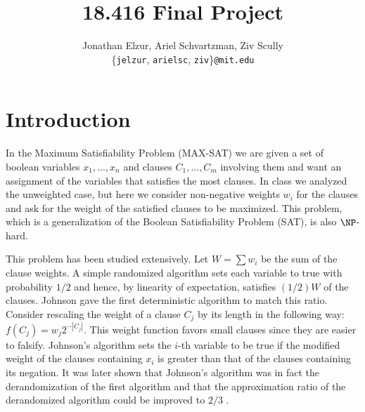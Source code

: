 \documentclass[11pt,letter]{article}
\numberwithin{theorem}{section}
\begin{document}


\title{18.416 Final Project}

\author{Jonathan Elzur, Ariel Schvartzman, Ziv Scully \\
  \{\texttt{jelzur}, \texttt{arielsc}, \texttt{ziv}\}\texttt{@mit.edu}}

\maketitle


\section{Introduction}

In the Maximum Satisfiability Problem (MAX-SAT) we are given a set of boolean variables $x_1, ..., x_n$
and clauses $C_1,...,C_m$ involving them and want an assignment of the variables that satisfies the most clauses.
In class we analyzed the unweighted case, but here we consider non-negative weights $w_i$ for the clauses
and ask for the weight of the satisfied clauses to be maximized. This problem, which is a generalization of the
Boolean Satisfiability Problem (SAT), is also $\NP$-hard.

This problem has been studied extensively. Let $W = \sum w_i$ be the sum of the clause weights.
A simple randomized algorithm sets each variable to true with probability $1/2$ and hence,
by linearity of expectation, satisfies $(1/2)W$ of the clauses. Johnson \cite{Johnson1974256}
gave the first deterministic algorithm to match this ratio. Consider rescaling the weight of a clause $C_j$
by its length in the following way: $f(C_j) = w_j 2^{-|C_j|}$. This weight function favors small clauses
since they are easier to falsify. Johnson's algorithm sets the $i$-th variable to be true
if the modified weight of the clauses containing $x_i$ is greater than that of the clauses containing its negation.
It was later shown that Johnson's algorithm was in fact the derandomization of the first algorithm and that the
approximation ratio of the derandomized algorithm could be improved to $2/3$ \cite{Chen1999622}.
\end{document}
